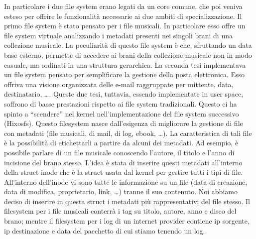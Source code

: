 \documentclass[a4paper,12pt]{article}
\newcommand{\ua }{\`{u} }
\renewcommand{\aa }{\`{a} }
\newcommand{\ea }{\`{e} }
\begin{document}
In particolare i due file system erano legati da un core comune, che poi veniva esteso per offrire le funzionalità necessarie ai due ambiti di specializzazione.
Il primo file system \ea stato pensato per i file musicali.
In particolare esso offre un file system virtuale analizzando i metadati presenti nei singoli brani di una collezione musicale.
La peculiarità di questo file system è che, sfruttando un data base esterno, permette di accedere ai brani della collezione musicale non in modo casuale, ma ordinati in una struttura gerarchica.
La seconda tesi implementava un file system pensato per semplificare la gestione della posta elettronica.
Esso offriva una visione organizzata delle e-mail raggruppate per mittente, data, destinatario, \dots.
Queste due tesi, tuttavia, essendo implementate in user space, soffrono di basse prestazioni rispetto ai file system tradizionali.
Questo ci ha spinto a ``scendere'' nel kernel nell'implementazione del file system successivo (Hixosfs). Questo filesystem nasce dall'esigenza di migliorare la gestione di file con metadati (file musicali, di mail, di log, ebook, \dots). La caratteristica di tali file \ea la possibilit\aa di etichettarli a partire da alcuni dei metadati. Ad esempio, \ea possibile parlare di un file musicale conoscendo l'autore, il titolo e l'anno di incisione del brano stesso. L'idea \ea stata di inserire questi metadati all'interno della struct inode che \ea la struct usata dal kernel per gestire tutti i tipi di file. All'interno dell'inode vi sono tutte le informazione su un file (data di creazione, data di modifica, proprietario, link, \dots) tranne il suo contenuto. Noi abbiamo deciso di inserire in questa struct i metadati pi\ua rappresentativi del file stesso. Il filesystem per i file musicali conterr\aa i tag su titolo, autore, anno e disco del brano; mentre il filesystem per i log di un internet provider contiene ip sorgente, ip destinazione e data del pacchetto di cui stiamo tenendo un log.
\end{document}
